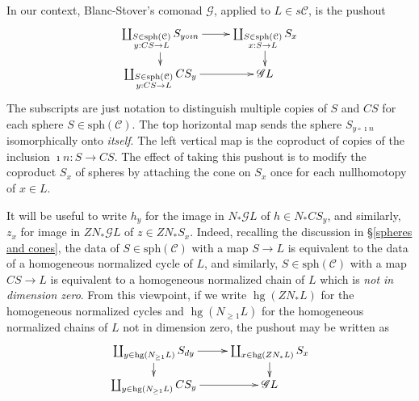 \documentclass[11pt]{amsart} \renewcommand{\baselinestretch}{1.2}
\theoremstyle{plain}
\numberwithin{equation}{section} %
\theoremstyle{plain}
\numberwithin{equation}{chapter} %
\DeclareMathOperator{\homog}{hg}
\renewcommand{\to}{\longrightarrow}
\newcommand{\scrG}{\mathscr{G}}
\newcommand{\calc}{\mathcal{C}}
\newcommand{\spheres}[1]{\mathrm{sph}(#1)}
\newcommand{\BSW}{{\scrG}}
\newcommand{\bdyinc}{\imath n}
\begin{document}
\begin{Comp funct sseqs}
In our context, Blanc-Stover's comonad $\BSW$, applied to $L\in s\calc$, is the pushout
\[\xymatrix@R=4mm{
\coprod_{\substack{S\in\spheres{\calc}\\y:CS\rightarrow L}}S_{ y\circ\bdyinc}
\ar[r]\ar[d]%
&%
\coprod_{\substack{S\in\spheres{\calc}\\x:S\rightarrow L}}S_{ x}\ar[d]\\%
\coprod_{\substack{S\in\spheres{\calc}\\y:CS\rightarrow L}}CS_{ y}
\ar[r]&%
\BSW L%
}\]
The subscripts are just notation to distinguish multiple copies of $S$ and $CS$ for each sphere $S\in\spheres{\calc}$.
The top horizontal map sends the sphere $S_{ y\circ\bdyinc}$ isomorphically onto \emph{itself}. The left vertical map is the coproduct of copies of the inclusion $\bdyinc:S\to CS$. The effect of taking this pushout is to modify the coproduct $S_{ x}$ of spheres by attaching the  cone on $S_{ x}$  once for each nullhomotopy of $x\in L$.

It will be useful to write $h_y$ for the image in $N_*\BSW L$ of $h\in N_*CS_{ y}$, and similarly, $z_x$ for image in $ZN_*\BSW L$ of $z\in ZN_*S_{ x}$. Indeed, recalling the discussion in \S\ref{spheres and cones}, the data of $S\in\spheres{\calc}$ with a map $S\to L$ is equivalent to the data of a homogeneous normalized cycle of $L$, and similarly, $S\in\spheres{\calc}$ with a map $CS\to L$ is equivalent to a homogeneous normalized chain of $L$ which is \emph{not in dimension zero}. From this viewpoint, if we write $\homog (ZN_*L)$ for the homogeneous normalized cycles and $\homog (N_{\geq1}L)$ for the homogeneous normalized chains of $L$ not in dimension zero, the pushout may be written as
\[\xymatrix@R=4mm{
\coprod_{y\in \homog (N_{\geq1}L)}S_{ dy}
\ar[r]\ar[d]%
&%
\coprod_{x\in \homog (ZN_*L)}S_{ x}\ar[d]\\%
\coprod_{y\in \homog (N_{\geq1}L)}CS_{ y}
\ar[r]&%
\BSW L%
}\]




\end{Comp funct sseqs}
\end{document}
